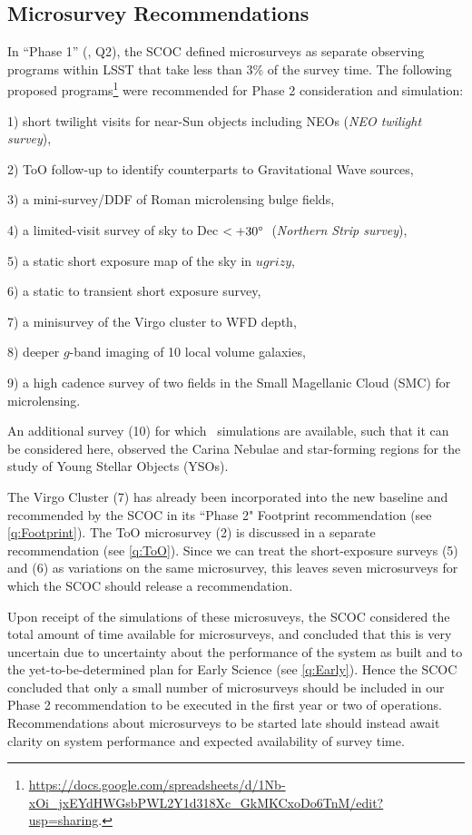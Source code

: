 \subsection{Microsurvey Recommendations}\label{q:Micro}


In ``Phase 1'' (, Q2), the SCOC  defined microsurveys as separate observing programs within LSST that take less than 3\% of the survey time. The following proposed programs\footnote{\url{https://docs.google.com/spreadsheets/d/1Nb-xOi_jxEYdHWGsbPWL2Y1d318Xc_GkMKCxoDo6TnM/edit?usp=sharing}.} were recommended for Phase 2 consideration and simulation:


1) short twilight visits for near-Sun objects including NEOs (\emph{NEO twilight survey}), 

2) ToO follow-up to identify counterparts to Gravitational Wave sources, 

3) a mini-survey/DDF of Roman microlensing bulge fields,

4) a limited-visit survey of sky to Dec $< +30^{\circ} $~(\emph{Northern Strip survey}),

5) a static short exposure map of the sky in $ugrizy$,

6) a static to transient short exposure survey, 

7) a minisurvey of the Virgo cluster to WFD depth, 

8) deeper $g$-band imaging of 10 local volume galaxies,

9) a high cadence survey of two fields in the Small Magellanic Cloud (SMC) for microlensing. 

An additional survey (10) for which \opsim\ simulations are available, such that it can be considered here, observed the Carina Nebulae and star-forming regions for the study of Young Stellar Objects (YSOs).  

The Virgo Cluster (7) has already been incorporated into the new baseline and recommended by the SCOC in its ``Phase 2" Footprint recommendation (see \autoref{q:Footprint}). The ToO microsurvey (2) is discussed in a separate recommendation (see \autoref{q:ToO}). 
Since we can treat the short-exposure surveys (5) and (6) as variations on the same microsurvey, this leaves seven microsurveys for which the SCOC should release a recommendation.

Upon receipt of the simulations of these microsuveys, the SCOC considered the total amount of time available for microsurveys, and concluded that this is very uncertain due to uncertainty about the performance of the system as built and to the yet-to-be-determined plan for Early Science (see \autoref{q:Early}). Hence the SCOC concluded that only a small number of microsurveys should be included in our Phase 2 recommendation to be executed in the first year or two of operations. Recommendations about microsurveys to be started late should instead await clarity on system performance and expected availability of survey time. 

